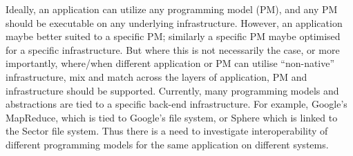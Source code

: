 \documentclass[3p,twocolumn]{elsarticle}
\begin{document}
Ideally, an application can utilize any programming model (PM), and any PM should be
executable on any underlying infrastructure. However, an application
maybe better suited to a specific PM; similarly a specific PM maybe
optimised for a specific infrastructure. But where this is not
necessarily the case, or more importantly, where/when different
application or PM can utilise ``non-native'' infrastructure, mix and
match across the layers of application, PM and infrastructure should
be supported.  Currently, many programming models and abstractions are
tied to a specific back-end infrastructure.  For example, Google's
MapReduce, which is tied to Google's file system, or
Sphere\cite{sectorsphere09} which is linked to the Sector file
system. Thus there is a need to investigate interoperability of
different programming models for the same application on different
systems.







\end{document}
